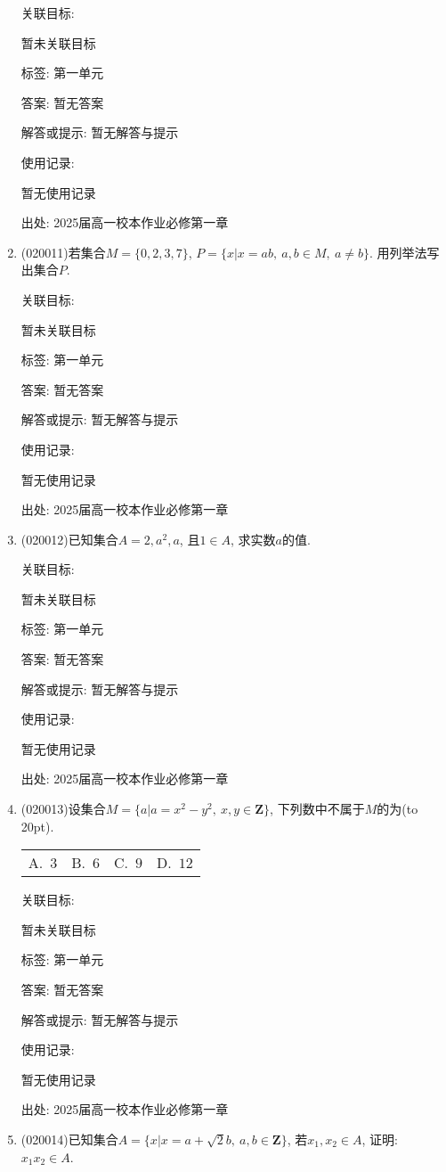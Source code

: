 \documentclass[10pt,a4paper]{article}
\newcommand{\bracket}[1]{(\hbox to #1pt{})}
\newcommand{\fourch}[4]{\par\begin{tabular}{p{.23\textwidth}p{.23\textwidth}p{.23\textwidth}p{.23\textwidth}}
A.~#1 &B.~#2& C.~#3& D.~#4
\end{tabular}}
\begin{document}
\begin{enumerate}[1.]
关联目标:

暂未关联目标



标签: 第一单元

答案: 暂无答案

解答或提示: 暂无解答与提示

使用记录:

暂无使用记录


出处: 2025届高一校本作业必修第一章
\item { (020011)}若集合$M=\{0,2,3,7\}$, $P=\{x|x=ab,\ a,b\in M, \ a\ne b\}$. 用列举法写出集合$P$.


关联目标:

暂未关联目标



标签: 第一单元

答案: 暂无答案

解答或提示: 暂无解答与提示

使用记录:

暂无使用记录


出处: 2025届高一校本作业必修第一章
\item { (020012)}已知集合$A={2, a^2, a}$, 且$1\in A$, 求实数$a$的值.


关联目标:

暂未关联目标



标签: 第一单元

答案: 暂无答案

解答或提示: 暂无解答与提示

使用记录:

暂无使用记录


出处: 2025届高一校本作业必修第一章
\item { (020013)}设集合$M=\{a|a=x^2-y^2, \ x,y\in\mathbf{Z}\}$, 下列数中不属于$M$的为\bracket{20}.
\fourch{$3$}{$6$}{$9$}{$12$}


关联目标:

暂未关联目标



标签: 第一单元

答案: 暂无答案

解答或提示: 暂无解答与提示

使用记录:

暂无使用记录


出处: 2025届高一校本作业必修第一章
\item { (020014)}已知集合$A=\{x|x=a+\sqrt 2b,\ a,b\in \mathbf{Z}\}$, 若$x_1,x_2\in A$, 证明: $x_1x_2\in A$.



\end{enumerate}
\end{document}
